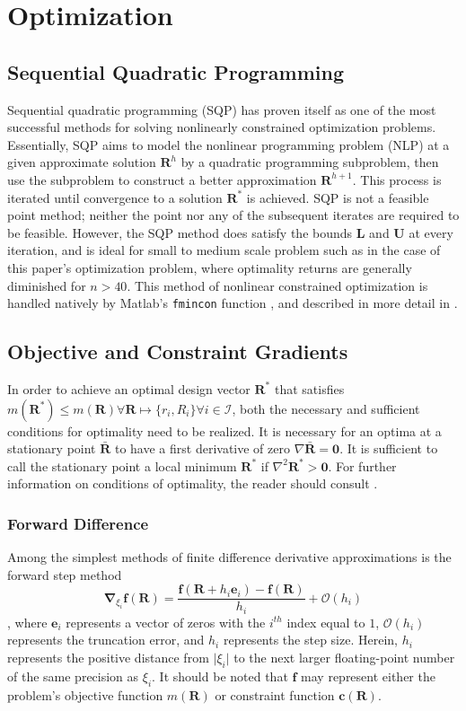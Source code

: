 \documentclass{article}
\begin{document}
\section{Optimization}
\subsection{Sequential Quadratic Programming}
Sequential quadratic programming (SQP) has proven itself as one of the most successful methods for solving nonlinearly constrained optimization problems. Essentially, SQP aims to model the nonlinear programming problem (NLP) at a given approximate solution $\mathbf{R}^h$ by a quadratic programming subproblem, then use the subproblem to construct a better approximation $\mathbf{R}^{h+1}$. This process is iterated until convergence to a solution $\mathbf{R}^*$ is achieved. SQP is not a feasible point method; neither the point nor any of the subsequent iterates are required to be feasible. However, the SQP method does satisfy the bounds $\mathbf{L}$ and $\mathbf{U}$ at every iteration, and is ideal for small to medium scale problem such as in the case of this paper's optimization problem, where optimality returns are generally diminished for $n>40$. This method of nonlinear constrained optimization is handled natively by Matlab's \lstinline{fmincon} function \cite{Attaway2013}, and described in more detail in \cite{Boggs1995}.

\subsection{Objective and Constraint Gradients}
In order to achieve an optimal design vector $\mathbf{R}^*$ that satisfies $m(\mathbf{R}^*) \leq m(\mathbf{R}) \forall \mathbf{R} \mapsto \{r_i, R_i\} \forall i \in \mathcal{I}$, both the necessary and sufficient conditions for optimality need to be realized. It is necessary for an optima at a stationary point $\mathbf{\bar{R}}$ to have a first derivative of zero $\nabla \mathbf{\bar{R}} = \mathbf{0}$. It is sufficient to call the stationary point a local minimum $\mathbf{R^*}$ if $\nabla^2 \mathbf{R^*} > \mathbf{0}$. For further information on conditions of optimality, the reader should consult \cite{Kuhn1951}.

\subsubsection{Forward Difference}
Among the simplest methods of finite difference derivative approximations is the forward step method
$$ \mathbf{\nabla}_{\xi_i}\mathbf{f}(\mathbf{R}) =
\frac{\mathbf{f}(\mathbf{R} + h_i\mathbf{e}_i) - \mathbf{f}(\mathbf{R})}{h_i} + \mathcal{O}(h_i)$$
, where $\mathbf{e}_i$ represents a vector of zeros with the $i^{th}$ index equal to $1$, $\mathcal{O}(h_i)$ represents the truncation error, and $h_i$ represents the step size. Herein, $h_i$ represents the positive distance from $\lvert \xi_i \rvert$ to the next larger floating-point number of the same precision as $\xi_i$. It should be noted that $\mathbf{f}$ may represent either the problem's objective function $m(\mathbf{R})$ or constraint function $\mathbf{c}(\mathbf{R})$.
\end{document}
